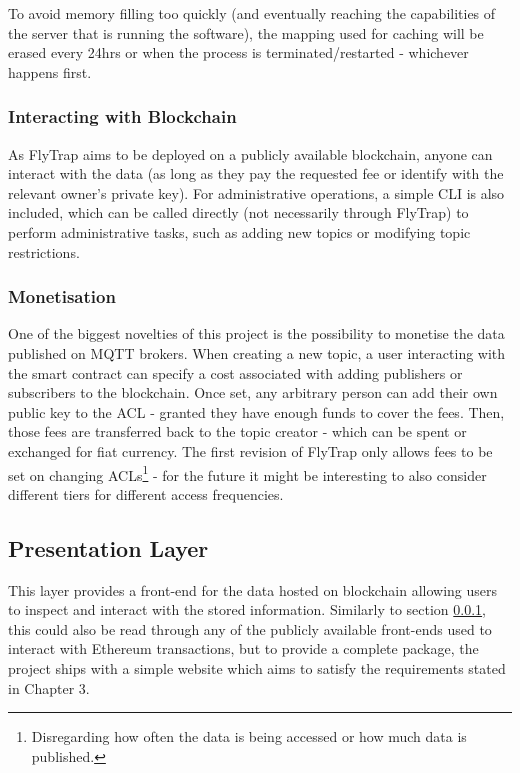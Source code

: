 To avoid memory filling too quickly (and eventually reaching the capabilities of the server that is running the software), the mapping used for caching will be erased every 24hrs or when the process is terminated/restarted - whichever happens first.

\subsubsection{Interacting with Blockchain}\label{sec:interact}
As FlyTrap aims to be deployed on a publicly available blockchain, anyone can interact with the data (as long as they pay the requested fee or identify with the relevant owner's private key). For administrative operations, a simple CLI is also included, which can be called directly (not necessarily through FlyTrap) to perform administrative tasks, such as adding new topics or modifying topic restrictions.

\subsubsection{Monetisation}\label{sec:monetization}
One of the biggest novelties of this project is the possibility to monetise the data published on MQTT brokers. When creating a new topic, a user interacting with the smart contract can specify a cost associated with adding publishers or subscribers to the blockchain. Once set, any arbitrary person can add their own public key to the ACL - granted they have enough funds to cover the fees. Then, those fees are transferred back to the topic creator - which can be spent or exchanged for fiat currency. The first revision of FlyTrap only allows fees to be set on changing ACLs\footnote{Disregarding how often the data is being accessed or how much data is published.} - for the future it might be interesting to also consider different tiers for different access frequencies. 

\subsection{Presentation Layer}
This layer provides a front-end for the data hosted on blockchain allowing users to inspect and interact with the stored information. Similarly to section \ref{sec:interact}, this could also be read through any of the publicly available front-ends used to interact with Ethereum transactions, but to provide a complete package, the project ships with a simple website which aims to satisfy the requirements stated in Chapter 3.
